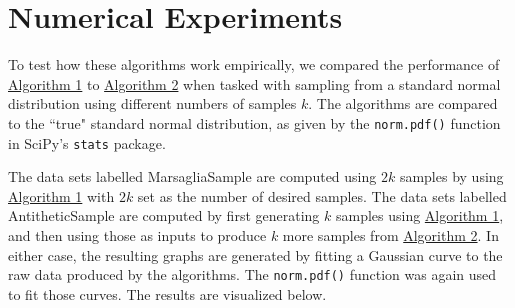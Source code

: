 \documentclass[12pt, a4paper]{article}
\begin{document}
\section{Numerical Experiments} \label{sec:4}
To test how these algorithms work empirically, we compared the performance of \hyperref[alg:marsaglia]{Algorithm 1} to \hyperref[alg:antithetic]{Algorithm 2}
when tasked with sampling from a standard normal distribution using different numbers of samples $k$.
The algorithms are compared to the ``true" standard normal distribution, as given by the \texttt{norm.pdf()} function in SciPy's \texttt{stats} package.

The data sets labelled {\sc MarsagliaSample} are computed using $2k$ samples by using \hyperref[alg:marsaglia]{Algorithm 1} with $2k$ set as the number of desired samples.
The data sets labelled {\sc AntitheticSample} are computed by first generating $k$ samples using \hyperref[alg:marsaglia]{Algorithm 1},
and then using those as inputs to produce $k$ more samples from \hyperref[alg:antithetic]{Algorithm 2}.
In either case, the resulting graphs are generated by fitting a Gaussian curve to the raw data produced by the algorithms.
The \texttt{norm.pdf()} function was again used to fit those curves.
The results are visualized below.
\end{document}
